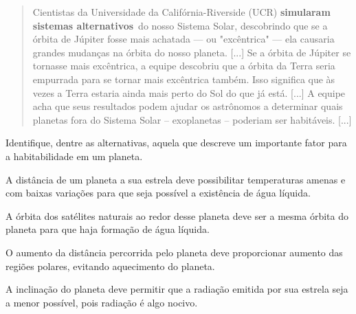\begin{quote}
Cientistas da Universidade da Califórnia-Riverside
(UCR) \textbf{simularam sistemas alternativos}~do nosso Sistema Solar,
descobrindo que se a órbita de Júpiter fosse mais achatada --- ou
"excêntrica" --- ela causaria grandes mudanças na órbita do nosso planeta. [...]
Se a órbita de Júpiter se tornasse mais excêntrica, a equipe
descobriu que a órbita da Terra seria empurrada para se tornar mais
excêntrica também. Isso significa que às vezes a Terra estaria ainda
mais perto do Sol do que já está. [...]
A equipe acha que seus resultados
podem ajudar os astrônomos a determinar quais planetas fora do Sistema
Solar -- exoplanetas -- poderiam ser habitáveis. [...]

\end{quote}

Identifique, dentre as alternativas, aquela que descreve um importante
fator para a habitabilidade em um planeta.

\begin{escolha}
\item
  A distância de um planeta a sua estrela deve possibilitar temperaturas
  amenas e com baixas variações para que seja possível a existência de
  água líquida.
\item
  A órbita dos satélites naturais ao redor desse planeta deve ser a
  mesma órbita do planeta para que haja formação de água líquida.
\item
  O aumento da distância percorrida pelo planeta deve proporcionar
  aumento das regiões polares, evitando aquecimento do planeta.
\item
  A inclinação do planeta deve permitir que a radiação emitida por sua
  estrela seja a menor possível, pois radiação é algo nocivo.
\end{escolha}



